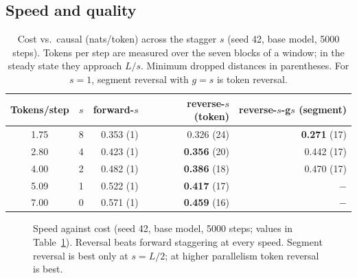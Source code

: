 \documentclass[11pt]{article}
\theoremstyle{definition}
\theoremstyle{remark}
\newcommand{\sch}[1]{\textsf{#1}}
\begin{document}
\subsection{Speed and quality}
\label{sec:tradeoff}

\begin{table}[t]
  \centering
  \caption{Cost vs.\ causal (nats/token) across the stagger $s$ (seed 42, base model, 5000 steps). Tokens per step are measured over the seven blocks of a window; in the steady state they approach $L/s$. Minimum dropped distances in parentheses. For $s=1$, segment reversal with $g=s$ is token reversal.}
  \label{tab:tradeoff}
  \small
  \begin{tabular}{crrrr}
    \toprule
    Tokens/step & $s$ & \sch{forward-$s$} & \sch{reverse-$s$} (token) & \sch{reverse-$s$-g$s$} (segment) \\
    \midrule
    1.75 & 8 & 0.353 (1) & 0.326 (24) & \textbf{0.271} (17) \\
    2.80 & 4 & 0.423 (1) & \textbf{0.356} (20) & 0.442 (17) \\
    4.00 & 2 & 0.482 (1) & \textbf{0.386} (18) & 0.470 (17) \\
    5.09 & 1 & 0.522 (1) & \textbf{0.417} (17) & $-$ \\
    7.00 & 0 & 0.571 (1) & \textbf{0.459} (16) & $-$ \\
    \bottomrule
  \end{tabular}
\end{table}

\begin{figure}[t]
  \centering
  
  \caption{Speed against cost (seed 42, base model, 5000 steps; values in Table~\ref{tab:tradeoff}). Reversal beats forward staggering at every speed. Segment reversal is best only at $s=L/2$; at higher parallelism token reversal is best.}
  \label{fig:tradeoff}
\end{figure}
\end{document}

